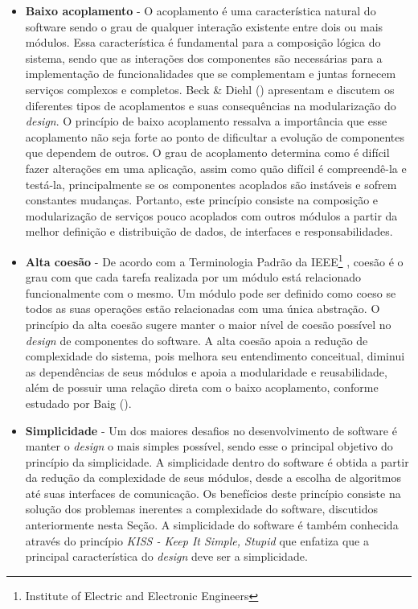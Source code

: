 \begin{itemize}
\item \textbf{Baixo acoplamento} - O acoplamento é uma característica natural do software sendo o grau de qualquer interação existente entre dois ou mais módulos.
%
Essa característica é fundamental para a composição lógica do sistema, sendo que as interações dos componentes são necessárias para a implementação de funcionalidades que se complementam e juntas fornecem serviços complexos e completos.
%
Beck \& Diehl (\citeyear{diehl2011}) apresentam e discutem os diferentes tipos de acoplamentos e suas consequências na modularização do \emph{design}.
%
O princípio de baixo acoplamento ressalva a importância que esse acoplamento não seja forte ao ponto de dificultar a evolução de componentes que dependem de outros.
%
O grau de acoplamento determina como é difícil fazer alterações em uma aplicação, assim como quão difícil é compreendê-la e testá-la, principalmente se os componentes acoplados são instáveis e sofrem constantes mudanças.
%
Portanto, este princípio consiste na composição e modularização de serviços pouco acoplados com outros módulos a partir da melhor definição e distribuição de dados, de interfaces e responsabilidades.

\item \textbf{Alta coesão} - De acordo com a Terminologia Padrão da IEEE\footnote{Institute of Electric and Electronic Engineers} \cite{ieee1990}, coesão é o grau com que cada tarefa realizada por um módulo está relacionado funcionalmente com o mesmo.
%
Um módulo pode ser definido como coeso se todos as suas operações estão relacionadas com uma única abstração.
%
O princípio da alta coesão sugere manter o maior nível de coesão possível no \emph{design} de componentes do software.
%
A alta coesão apoia a redução de complexidade do sistema, pois melhora seu entendimento conceitual, diminui as dependências de seus módulos e apoia a modularidade e reusabilidade, além de possuir uma relação direta com o baixo acoplamento, conforme estudado por Baig (\citeyear{baig2004}).

\item \textbf{Simplicidade} - Um dos maiores desafios no desenvolvimento de software é manter o \emph{design} o mais simples possível, sendo esse o principal objetivo do princípio da simplicidade.
%
A simplicidade dentro do software é obtida a partir da redução da complexidade de seus módulos, desde a escolha de algoritmos até suas interfaces de comunicação.
%
Os benefícios deste princípio consiste na solução dos problemas inerentes a complexidade do software, discutidos anteriormente nesta Seção.
%
A simplicidade do software é também conhecida através do princípio \emph{KISS - Keep It Simple, Stupid} que enfatiza que a principal característica do \emph{design} deve ser a simplicidade.

\end{itemize}


